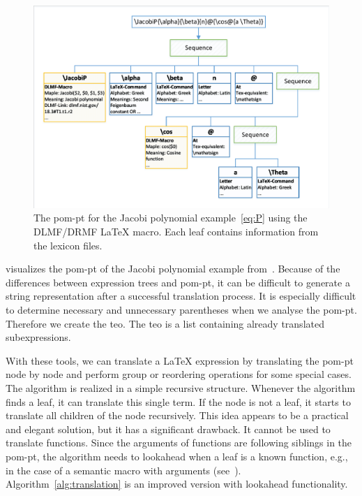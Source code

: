 \documentclass[a4paper,11pt]{article}
\theoremstyle{defTheoStyle}
\theoremstyle{defExampStyle}
\begin{document}
	\begin{figure}[ht]
		\centering
		\includegraphics[clip, trim=0.2cm 0.2cm 0.2cm 0.2cm, scale=0.75]{SyntaxTreeUseCase.pdf}
		\caption{The \gls*{pom-pt} for the Jacobi polynomial example~\eqref{eq:P} using the DLMF/DRMF \LaTeX{} macro. Each leaf contains information from the lexicon files.}
		\label{fig:syntax-tree-usecase}
		\vspace{-10pt}
	\end{figure}
	
	 visualizes the \gls*{pom-pt} of the Jacobi polynomial example from~. Because of the differences between expression trees and \gls*{pom-pt}, it can be difficult to generate a string representation after a successful translation process. It is especially difficult to determine necessary and unnecessary parentheses when we analyse the \gls*{pom-pt}. Therefore we create the \gls*{teo}. The \gls*{teo} is a list containing already translated subexpressions.
	
	With these tools, we can translate a \LaTeX{} expression by translating the \gls*{pom-pt} node by node and perform group or reordering operations for some special cases. The algorithm is realized in a simple recursive structure. Whenever the algorithm finds a leaf, it can translate this single term. If the node is not a leaf, it starts to translate all children of the node recursively. This idea appears to be a practical and elegant solution, but it has a significant drawback. It cannot be used to translate functions. Since the arguments of functions are following siblings in the \gls*{pom-pt}, the algorithm needs to lookahead when a leaf is a known function, e.g., in the case of a semantic macro with arguments (see~). Algorithm~\ref{alg:translation} is an improved version with lookahead functionality.
	
\end{document}
